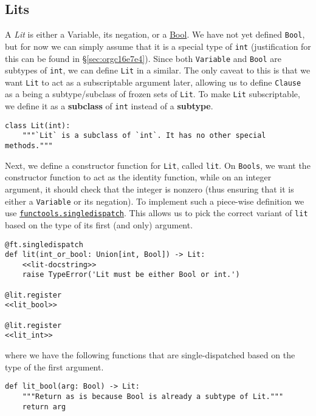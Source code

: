 \documentclass[11pt]{article}
\begin{document}
\subsection{Lits}
\label{sec:org06a8c37}
A \emph{Lit} is either a Variable, its negation, or a \hyperref[sec:orgc16e7e4]{Bool}. We have not yet defined
\texttt{Bool}, but for now we can simply assume that it is a special type of \texttt{int}
(justification for this can be found in \S \ref{sec:orgc16e7e4}). Since both \texttt{Variable} and \texttt{Bool}
are subtypes of \texttt{int}, we can define \texttt{Lit} in a similar.  The only caveat to
this is that we want \texttt{Lit} to act as a subscriptable argument later, allowing us
to define \texttt{Clause} as a being a subtype/subclass of frozen sets of \texttt{Lit}. To
make \texttt{Lit} subscriptable, we define it as a \textbf{subclass} of \texttt{int} instead of a
\textbf{subtype}.

\begin{verbatim}
class Lit(int):
    """`Lit` is a subclass of `int`. It has no other special methods."""
\end{verbatim}

Next, we define a constructor function for \texttt{Lit}, called \texttt{lit}.  On \texttt{Bools}, we
want the constructor function to act as the identity function, while on an
integer argument, it should check that the integer is nonzero (thus ensuring
that it is either a \texttt{Variable} or its negation).  To implement such a piece-wise
definition we use \href{https://docs.python.org/3/library/functools.html\#functools.singledispatch}{\texttt{functools.singledispatch}}.  This allows us to pick the
correct variant of \texttt{lit} based on the type of its first (and only) argument.


\begin{verbatim}
@ft.singledispatch
def lit(int_or_bool: Union[int, Bool]) -> Lit:
    <<lit-docstring>>
    raise TypeError('Lit must be either Bool or int.')

@lit.register
<<lit_bool>>

@lit.register
<<lit_int>>
\end{verbatim}

where we have the following functions that are single-dispatched based
on the type of the first argument.

\begin{verbatim}
def lit_bool(arg: Bool) -> Lit:
    """Return as is because Bool is already a subtype of Lit."""
    return arg
\end{verbatim}
\end{document}
